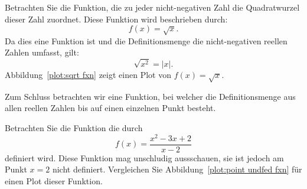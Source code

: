 \begin{example}
Betrachten Sie die Funktion, die zu jeder nicht-negativen Zahl die Quadratwurzel dieser Zahl zuordnet. Diese Funktion wird beschrieben durch:
\[
f(x) = \sqrt{x}.
\]
Da dies eine Funktion ist und die Definitionsmenge die nicht-negativen reellen Zahlen umfasst, gilt:
\[
\sqrt{x^2} = |x|.
\]
Abbildung~\ref{plot:sqrt fxn} zeigt einen Plot von $f(x) = \sqrt{x}$.
\end{example}

Zum Schluss betrachten wir eine Funktion, bei welcher die Definitionsmenge aus allen reellen Zahlen bis auf einen einzelnen Punkt besteht.

\begin{example}
Betrachten Sie die Funktion die durch
\[
f(x) = \frac{x^2 - 3x + 2}{x-2}
\]
definiert wird. Diese Funktion mag unschludig aussschauen, sie ist jedoch am Punkt $x=2$ nicht definiert. Vergleichen Sie Abbildung~\ref{plot:point undfed fxn} für einen Plot dieser Funktion.
\end{example}




